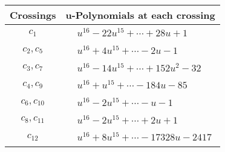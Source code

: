 \documentclass[1p]{elsarticle_modified}
\theoremstyle{definition}
\begin{document}
\begin{tabular}{m{50pt}|m{274pt}}
Crossings & \hspace{64pt}u-Polynomials at each crossing \\
\hline $$\begin{aligned}c_{1}\end{aligned}$$&$\begin{aligned}
&u^{16}-22 u^{15}+\cdots+28 u+1
\end{aligned}$\\
\hline $$\begin{aligned}c_{2},c_{5}\end{aligned}$$&$\begin{aligned}
&u^{16}+4 u^{15}+\cdots-2 u-1
\end{aligned}$\\
\hline $$\begin{aligned}c_{3},c_{7}\end{aligned}$$&$\begin{aligned}
&u^{16}-14 u^{15}+\cdots+152 u^2-32
\end{aligned}$\\
\hline $$\begin{aligned}c_{4},c_{9}\end{aligned}$$&$\begin{aligned}
&u^{16}+u^{15}+\cdots-184 u-85
\end{aligned}$\\
\hline $$\begin{aligned}c_{6},c_{10}\end{aligned}$$&$\begin{aligned}
&u^{16}-2 u^{15}+\cdots- u-1
\end{aligned}$\\
\hline $$\begin{aligned}c_{8},c_{11}\end{aligned}$$&$\begin{aligned}
&u^{16}-2 u^{15}+\cdots+2 u+1
\end{aligned}$\\
\hline $$\begin{aligned}c_{12}\end{aligned}$$&$\begin{aligned}
&u^{16}+8 u^{15}+\cdots-17328 u-2417
\end{aligned}$\\
\hline
\end{tabular}\\~\\
\newpage\renewcommand{\arraystretch}{1}
\end{document}
